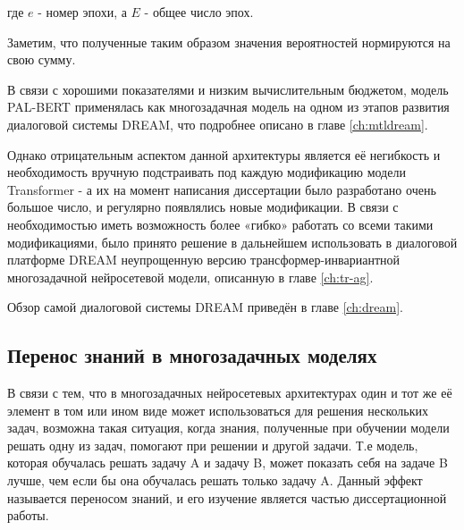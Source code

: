  где $e$ - номер эпохи, а $E$ - общее число эпох. 
 
Заметим, что полученные таким образом значения вероятностей нормируются на свою сумму. 

В связи с хорошими показателями и низким вычислительным бюджетом, модель PAL-BERT применялась как многозадачная модель на одном из этапов развития диалоговой системы DREAM, что подробнее описано в главе \ref{ch:mtldream}.

Однако отрицательным аспектом данной архитектуры является её негибкость и необходимость вручную подстраивать под каждую модификацию модели Transformer - а их на момент написания диссертации было разработано очень большое число, и регулярно появлялись новые модификации. В связи с необходимостью иметь возможность более «гибко» работать со всеми такими модификациями, было принято решение в дальнейшем использовать в диалоговой платформе {DREAM} неупрощенную версию трансформер-инвариантной многозадачной нейросетевой модели, описанную в главе \ref{ch:tr-ag}.

Обзор самой диалоговой системы {DREAM} приведён в главе \ref{ch:dream}.

\subsection{Перенос знаний в многозадачных моделях}

В связи с тем, что в многозадачных нейросетевых архитектурах один и тот же её элемент в том или ином виде может использоваться для решения нескольких задач, возможна такая ситуация, когда знания, полученные при обучении модели решать одну из задач, помогают при решении и другой задачи. Т.е модель, которая обучалась решать задачу A и задачу B, может показать себя на задаче B лучше, чем если бы она обучалась решать только задачу A. Данный эффект называется переносом знаний, и его изучение является частью диссертационной работы.
